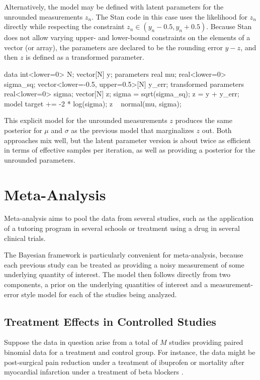 Alternatively, the model may be defined with latent parameters for the
unrounded measurements $z_n$.  The Stan code in this case uses the
likelihood for $z_n$ directly while respecting the constraint $z_n \in
(y_n - 0.5, y_n + 0.5)$.  Because Stan does not allow varying upper-
and lower-bound constraints on the elements of a vector (or array),
the parameters are declared to be the rounding error $y - z$, and
then $z$ is defined as a transformed parameter.
%
\begin{stancode}
data {
  int<lower=0> N;
  vector[N] y;
}
parameters {
  real mu;
  real<lower=0> sigma_sq;
  vector<lower=-0.5, upper=0.5>[N] y_err;
}
transformed parameters {
  real<lower=0> sigma;
  vector[N] z;
  sigma = sqrt(sigma_sq);
  z = y + y_err;
}
model {
  target += -2 * log(sigma);
  z ~ normal(mu, sigma);
}
\end{stancode}
%
This explicit model for the unrounded measurements $z$ produces the
same posterior for $\mu$ and $\sigma$ as the previous model that
marginalizes $z$ out.  Both approaches mix well, but the latent
parameter version is about twice as efficient in terms of effective
samples per iteration, as well as providing a posterior for the
unrounded parameters.


\section{Meta-Analysis}

Meta-analysis aims to pool the data from several studies, such as the
application of a tutoring program in several schools or treatment
using a drug in several clinical trials.

The Bayesian framework is particularly convenient for meta-analysis,
because each previous study can be treated as providing a noisy
measurement of some underlying quantity of interest.  The model then
follows directly from two components, a prior on the underlying
quantities of interest and a measurement-error style model for each of
the studies being analyzed.

\subsection{Treatment Effects in Controlled Studies}

Suppose the data in question arise from a total of $M$ studies
providing paired binomial data for a treatment and control group.  For
instance, the data might be post-surgical pain reduction under a treatment
of ibuprofen \citep{WarnThompsonSpiegelhalter:2002} or mortality after
myocardial infarction under a treatment of beta blockers
\citep[Section~5.6]{GelmanEtAl:2013}.

